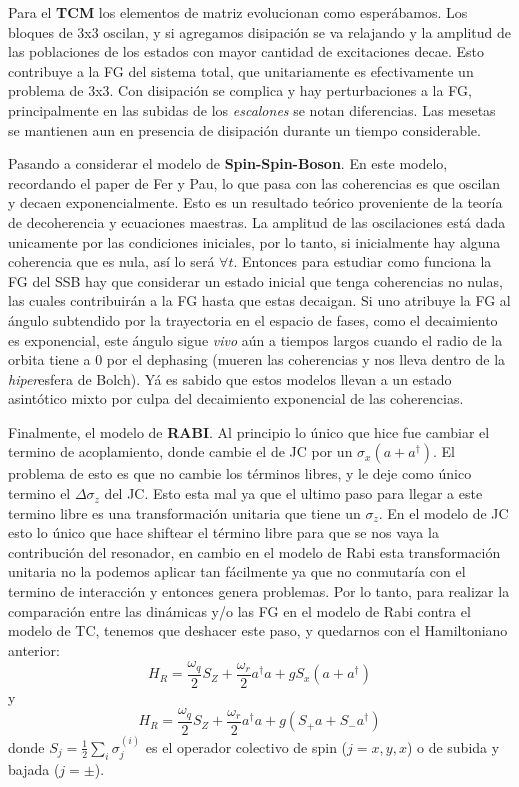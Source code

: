 Para el \textbf{TCM} los elementos de matriz evolucionan como esperábamos. Los bloques de 3x3 oscilan, y si agregamos disipación se va relajando y la amplitud de las poblaciones de los estados con mayor cantidad de excitaciones decae. Esto contribuye a la FG del sistema total, que unitariamente es efectivamente un problema de 3x3. Con disipación se complica y hay perturbaciones a la FG, principalmente en las subidas de los \textit{escalones} se notan diferencias. Las mesetas se mantienen aun en presencia de disipación durante un tiempo considerable. 

Pasando a considerar el modelo de \textbf{Spin-Spin-Boson}. En este modelo, recordando el paper de Fer y Pau, lo que pasa con las coherencias es que oscilan y decaen exponencialmente. Esto es un resultado teórico proveniente de la teoría de decoherencia y ecuaciones maestras. La amplitud de las oscilaciones está dada unicamente por las condiciones iniciales, por lo tanto, si inicialmente hay alguna coherencia que es nula, así lo será $\forall t$. Entonces para estudiar como funciona la FG del SSB hay que considerar un estado inicial que tenga coherencias no nulas, las cuales contribuirán a la FG hasta que estas decaigan. Si uno atribuye la FG al ángulo subtendido por la trayectoria en el espacio de fases, como el decaimiento es exponencial, este ángulo sigue \textit{vivo} aún a tiempos largos cuando el radio de la orbita tiene a 0 por el dephasing (mueren las coherencias y nos lleva dentro de la \textit{hiper}esfera de Bolch). Yá es sabido que estos modelos llevan a un estado asintótico mixto por culpa del decaimiento exponencial de las coherencias. 

Finalmente, el modelo de \textbf{RABI}. Al principio lo único que hice fue cambiar el termino de acoplamiento, donde cambie el de JC por un $\sigma_x(a+a^\dagger)$. El problema de esto es que no cambie los términos libres, y le deje como único termino el $\Delta\sigma_z$ del JC. Esto esta mal ya que el ultimo paso para llegar a este termino libre es una transformación unitaria que tiene un $\sigma_z$. En el modelo de JC esto lo único que hace shiftear el término libre para que se nos vaya la contribución del resonador, en cambio en el modelo de Rabi esta transformación unitaria no la podemos aplicar tan fácilmente ya que no conmutaría con el termino de interacción y entonces genera problemas. Por lo tanto, para realizar la comparación entre las dinámicas y/o las FG en el modelo de Rabi contra el modelo de TC, tenemos que deshacer este paso, y quedarnos con el Hamiltoniano anterior:
\begin{equation}
    H_R=\frac{\omega_q}{2}S_Z+\frac{\omega_r}{2}a^\dagger a+ gS_x(a+a^\dagger)
\end{equation}
y
\begin{equation}
     H_R=\frac{\omega_q}{2}S_Z+\frac{\omega_r}{2}a^\dagger a+ g(S_+a+S_-a^\dagger)
\end{equation}
donde $S_j=\frac{1}{2}\sum_i\sigma_j^{(i)}$ es el operador colectivo de spin ($j=x,y,x$) o de subida y bajada ($j=\pm$).

